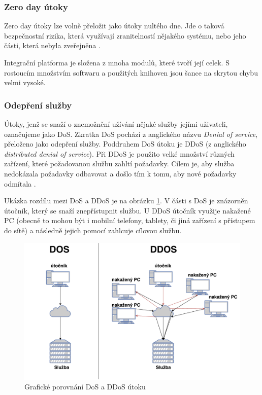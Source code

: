 \documentclass[thesis=M,czech]{FITthesis}[2012/10/20]
\newcommand{\tmpframe}[1]{\fbox{#1}}
\renewcommand{\tmpframe}[1]{#1}
\begin{document}
			\subsubsection{Zero day útoky}
				\label{sec:zero-day}
				Zero day útoky lze volně přeložit jako útoky nultého dne.
				Jde o taková bezpečnostní rizika, která využívají zranitelností nějakého systému, nebo jeho části, která nebyla zveřejněna \cite{investigationZ0}.
				
				Integrační platforma je složena z mnoha modulů, které tvoří její celek. S rostoucím množstvím softwaru a použitých knihoven jsou šance na skrytou chybu velmi vysoké. 
			
			\subsubsection{Odepření služby}
				Útoky, jenž se snaží o znemožnění užívání nějaké služby jejími uživateli, označujeme jako DoS. Zkratka DoS pochází z anglického názvu \textit{Denial of service}, přeloženo jako odepření služby. Poddruhem DoS útoku je DDoS (z anglického \textit{distributed denial of service}). Při DDoS je použito velké množství různých zařízení, které požadovanou službu zahltí požadavky. Cílem je, aby služba nedokázala požadavky odbavovat a došlo tím k tomu, aby nové požadavky odmítala \cite{dosAndDdos}.
				
				Ukázka rozdílu mezi DoS a DDoS je na obrázku \ref{fig:ddos}. V části s DoS je znázorněn útočník, který se snaží znepřístupnit službu. U DDoS útočník využije nakažené PC (obecně to mohou být i mobilní telefony, tablety, či jiná zařízení s přístupem do sítě) a následně jejich pomocí zahlcuje cílovou službu.	
				
				\begin{figure}[htb]\centering
					\tmpframe{\includegraphics[width=\textwidth]{./img/ddos}}		
					\caption{Grafické porovnání DoS a DDoS útoku}
					\label{fig:ddos}
				\end{figure}
				
\end{document}

